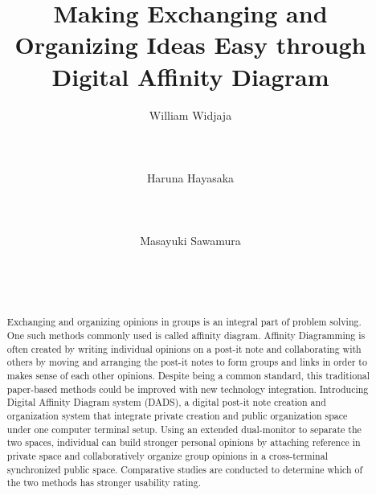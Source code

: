 \documentclass{sigchi}
\begin{document}
\title{Making Exchanging and Organizing Ideas Easy through Digital Affinity Diagram}

\author{
  \alignauthor William Widjaja\\
    \\
    \\
    \\
  \alignauthor Haruna Hayasaka \\
    \\
    \\
    \\
  \alignauthor Masayuki Sawamura \\
    \\
    \\
    \\
}

\maketitle

\begin{abstract}
Exchanging and organizing opinions in groups is an integral part of problem solving. One such methods commonly used is called affinity diagram. Affinity Diagramming is often created by writing individual opinions on a post-it note and collaborating with others by moving and arranging the post-it notes to form groups and links in order to makes sense of each other opinions. Despite being a common standard, this traditional paper-based methods could be improved with new technology integration. Introducing Digital Affinity Diagram system (DADS), a digital post-it note creation and organization system that integrate private creation and public organization space under one computer terminal setup. Using an extended dual-monitor to separate the two spaces, individual can build stronger personal opinions by attaching reference in private space and collaboratively organize group opinions in a cross-terminal synchronized public space.  Comparative studies are conducted to determine which of the two methods has stronger usability rating. 
\end{abstract}
\end{document}
